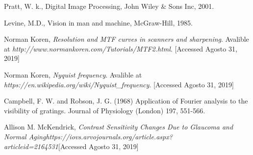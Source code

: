 \documentclass[conference]{IEEEtran}
\begin{document}
\begin{thebibliography}{00}
 Pratt, W. k., Digital Image Processing, John Wiley \& Sons Inc, 2001.

 Levine, M.D., Vision in man and machine, McGraw-Hill, 1985.

 Norman Koren, \textit{Resolution and MTF curves in scanners and sharpening}. Avalible at \textit{http://www.normankoren.com/Tutorials/MTF2.html}. [Accessed Agosto 31, 2019]

 Norman Koren, \textit{Nyquist frequency}. Avalible at \textit{https://en.wikipedia.org/wiki/Nyquist\_frequency}. [Accessed Agosto 31, 2019]


 Campbell, F. W. and Robson, J. G. (1968) Application of Fourier analysis to the visibility of gratings. Journal of Physiology (London) 197, 551-566.

 Allison M. McKendrick, \textit{Contrast Sensitivity Changes Due to Glaucoma and Normal Aging}\textit{https://iovs.arvojournals.org/article.aspx?\\articleid=2164531}[Accessed Agosto 31, 2019]

\end{thebibliography}


\end{document}
